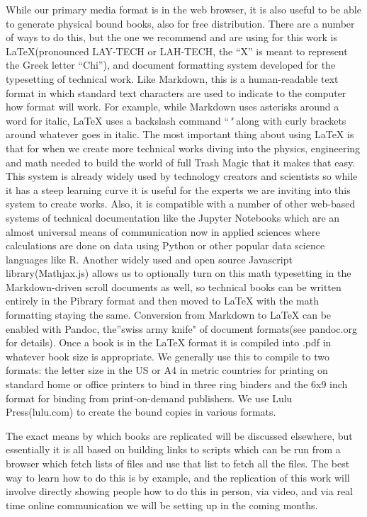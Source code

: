 While our primary media format is in the web browser, it is also useful
to be able to generate physical bound books, also for free distribution.
There are a number of ways to do this, but the one we recommend and are
using for this work is LaTeX(pronounced LAY-TECH or LAH-TECH, the ``X''
is meant to represent the Greek letter ``Chi''), and document formatting
system developed for the typesetting of technical work. Like Markdown,
this is a human-readable text format in which standard text characters
are used to indicate to the computer how format will work. For example,
while Markdown uses asterisks around a word for italic, LaTeX uses a
backslash command ``\emph" along with curly brackets around whatever
goes in italic. The most important thing about using LaTeX is that for
when we create more technical works diving into the physics, engineering
and math needed to build the world of full Trash Magic that it makes
that easy. This system is already widely used by technology creators and
scientists so while it has a steep learning curve it is useful for the
experts we are inviting into this system to create works. Also, it is
compatible with a number of other web-based systems of technical
documentation like the Jupyter Notebooks which are an almost universal
means of communication now in applied sciences where calculations are
done on data using Python or other popular data science languages like
R. Another widely used and open source Javascript library(Mathjax.js)
allows us to optionally turn on this math typesetting in the
Markdown-driven scroll documents as well, so technical books can be
written entirely in the Pibrary format and then moved to LaTeX with the
math formatting staying the same. Conversion from Markdown to LaTeX can
be enabled with Pandoc, the''swiss army knife" of document formats(see
pandoc.org for details). Once a book is in the LaTeX format it is
compiled into .pdf in whatever book size is appropriate. We generally
use this to compile to two formats: the letter size in the US or A4 in
metric countries for printing on standard home or office printers to
bind in three ring binders and the 6x9 inch format for binding from
print-on-demand publishers. We use Lulu Press(lulu.com) to create the
bound copies in various formats.

The exact means by which books are replicated will be discussed
elsewhere, but essentially it is all based on building links to scripts
which can be run from a browser which fetch lists of files and use that
list to fetch all the files. The best way to learn how to do this is by
example, and the replication of this work will involve directly showing
people how to do this in person, via video, and via real time online
communication we will be setting up in the coming months.

